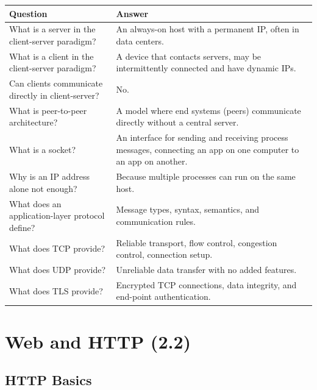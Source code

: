 \begin{exambox}
\small
\begin{longtable}{p{7cm}p{7cm}}
\toprule
\textbf{Question} & \textbf{Answer} \\
\midrule
\endhead
What is a server in the client-server paradigm? & An always-on host with a permanent IP, often in data centers. \\
\midrule
What is a client in the client-server paradigm? & A device that contacts servers, may be intermittently connected and have dynamic IPs. \\
\midrule
Can clients communicate directly in client-server? & No. \\
\midrule
What is peer-to-peer architecture? & A model where end systems (peers) communicate directly without a central server. \\
\midrule
What is a socket? & An interface for sending and receiving process messages, connecting an app on one computer to an app on another. \\
\midrule
Why is an IP address alone not enough? & Because multiple processes can run on the same host. \\
\midrule
What does an application-layer protocol define? & Message types, syntax, semantics, and communication rules. \\
\midrule
What does TCP provide? & Reliable transport, flow control, congestion control, connection setup. \\
\midrule
What does UDP provide? & Unreliable data transfer with no added features. \\
\midrule
What does TLS provide? & Encrypted TCP connections, data integrity, and end-point authentication. \\
\bottomrule
\end{longtable}
\end{exambox}


\newpage
\section{Web and HTTP (2.2)}

\subsection{HTTP Basics}

